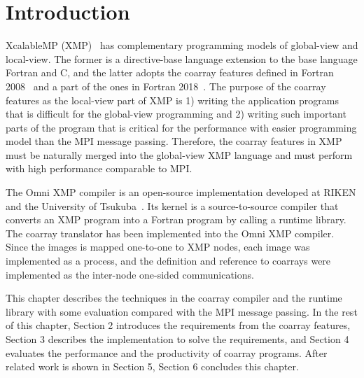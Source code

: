 \section{Introduction}\label{chap:intro}

\setcounter{page}{1}

XcalableMP (XMP)~\cite{xmp} has complementary programming models of
global-view and local-view. The former is a directive-base language 
extension to the base language Fortran and C, and the latter adopts 
the coarray features defined in Fortran 2008~\cite{coarray} and 
a part of the ones in Fortran 2018~\cite{coarray18}. 
%
The purpose of the coarray features as the local-view part of XMP is 
1) writing the application programs that is difficult for the global-view programming
and 2) writing such important parts of the program that is critical for the performance
with easier programming model than the MPI message passing.
Therefore, the coarray features in XMP must be naturally merged into the 
global-view XMP language and must perform with high performance comparable to MPI.

The Omni XMP compiler is an open-source implementation developed at RIKEN 
and the University of Tsukuba~\cite{omni}. 
Its kernel is a source-to-source compiler that converts an XMP program 
into a Fortran program by calling a runtime library.
%
The coarray translator has been implemented into the Omni XMP compiler.
Since the images is mapped one-to-one to XMP nodes, 
each image was implemented as a process, and 
the definition and reference to coarrays were implemented as the 
inter-node one-sided communications.

This chapter describes the techniques in the coarray compiler and 
the runtime library with some evaluation compared with the MPI message passing.
In the rest of this chapter, 
Section 2 introduces the requirements from the coarray features,
Section 3 describes the implementation to solve the requirements, and
Section 4 evaluates the performance and the productivity of coarray programs.
After related work is shown in Section 5, Section 6 concludes this chapter.


